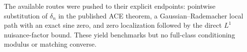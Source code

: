 The available routes were pushed to their explicit endpoints: pointwise substitution of \(\delta_n\) in the published ACE theorem, a Gaussian--Rademacher local path with an exact sine zero, and zero localization followed by the direct \(L^1\) nuisance-factor bound. These yield benchmarks but no full-class conditioning modulus or matching converse.